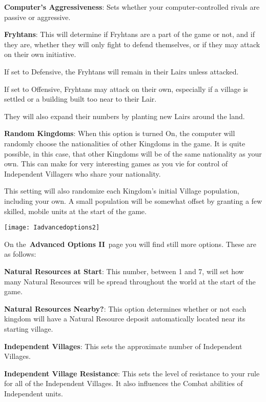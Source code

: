 \textbf{Computer’s Aggressiveness}: Sets whether your computer-controlled rivals are passive or aggressive.

\textbf{Fryhtans}: This will determine if Fryhtans are a part of the game or not, and if they are, whether they will only fight to defend themselves, or if they may attack on their own initiative.

\begin{adjustwidth}{1cm}{}
If set to Defensive, the Fryhtans will remain in their Lairs unless attacked.

If set to Offensive, Fryhtans may attack on their own, especially if a village is settled or a building built too near to their Lair. 

They will also expand their numbers by planting new Lairs around the land.
\end{adjustwidth}

\textbf{Random Kingdoms}: When this option is turned On, the computer will randomly choose the nationalities of other Kingdoms in the game. It is quite possible, in this case, that other Kingdoms will be of the same nationality as your own. This can make for very interesting games as you vie for control of Independent Villagers who share your nationality.

This setting will also randomize each Kingdom’s initial Village population, including your own. A small population will be somewhat offset by granting a few skilled, mobile units at the start of the game.

\begin{center}
	\texttt{[image: Iadvancedoptions2]}
\end{center}

On the \textbf{Advanced Options II} page you will find still more options. These are as follows:

\textbf{Natural Resources at Start}: This number, between 1 and 7, will set how many Natural Resources will be spread throughout the world at the start of the game.

\textbf{Natural Resources Nearby?}: This option determines whether or not each kingdom will have a Natural Resource deposit automatically located near its starting village.

\textbf{Independent Villages}: This sets the approximate number of Independent Villages.

\textbf{Independent Village Resistance}: This sets the level of resistance to your rule for all of the Independent Villages. It also influences the Combat abilities of Independent units.


